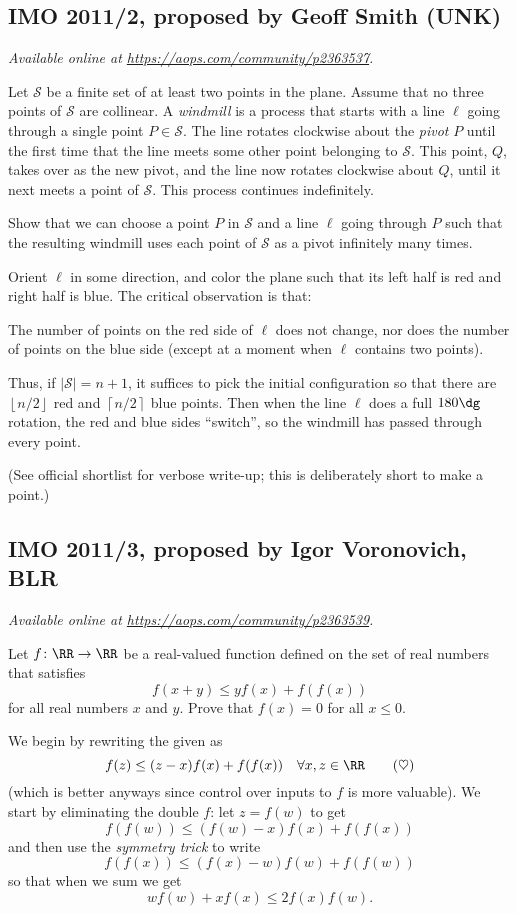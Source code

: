 \documentclass[11pt]{scrartcl}
\begin{document}
\subsection{IMO 2011/2, proposed by Geoff Smith (UNK)}
\textsl{Available online at \url{https://aops.com/community/p2363537}.}
\begin{mdframed}[style=mdpurplebox,frametitle={Problem statement}]
Let $\mathcal{S}$ be a finite set of at least two points in the plane.
Assume that no three points of $\mathcal S$ are collinear.
A \emph{windmill} is a process that starts with a
line $\ell$ going through a single point $P \in \mathcal S$.
The line rotates clockwise about the \emph{pivot} $P$ until the first time
that the line meets some other point belonging to $\mathcal S$.
This point, $Q$, takes over as the new pivot,
and the line now rotates clockwise about $Q$,
until it next meets a point of $\mathcal S$.
This process continues indefinitely.

Show that we can choose a point $P$ in $\mathcal S$ and
a line $\ell$ going through $P$ such that the resulting windmill
uses each point of $\mathcal S$ as a pivot infinitely many times.
\end{mdframed}
Orient $\ell$ in some direction,
and color the plane such that its left half is red
and right half is blue.
The critical observation is that:
\begin{claim*}
  The number of points on the red side of $\ell$ does not change,
  nor does the number of points on the blue side
  (except at a moment when $\ell$ contains two points).
\end{claim*}

Thus, if $|\mathcal S| = n+1$,
it suffices to pick the initial configuration
so that there are $\left\lfloor n/2 \right\rfloor$
red and $\left\lceil n/2 \right\rceil$ blue points.
Then when the line $\ell$ does a full $180\dg$ rotation,
the red and blue sides ``switch'',
so the windmill has passed through every point.

(See official shortlist for verbose write-up;
this is deliberately short to make a point.)
\pagebreak

\subsection{IMO 2011/3, proposed by Igor Voronovich, BLR}
\textsl{Available online at \url{https://aops.com/community/p2363539}.}
\begin{mdframed}[style=mdpurplebox,frametitle={Problem statement}]
Let $f \colon \RR \to \RR$ be a real-valued function
defined on the set of real numbers that satisfies
\[ f(x+y) \leq yf(x) + f(f(x))\]
for all real numbers $x$ and $y$.
Prove that $f(x) = 0$ for all $x \leq 0$.
\end{mdframed}
We begin by rewriting the given as
\[ f(z) \le (z-x)f(x) + f(f(x)) \quad
  \forall x,z \in \RR \qquad (\heartsuit) \]
(which is better anyways since control over inputs to $f$
is more valuable).
We start by eliminating the double $f$:
let $z = f(w)$ to get
\[ f(f(w)) \le (f(w)-x)f(x) + f(f(x)) \]
and then use the \emph{symmetry trick} to write
\[ f(f(x)) \le (f(x)-w)f(w) + f(f(w)) \]
so that when we sum we get
\[ wf(w) + xf(x) \le 2f(x)f(w). \]
\end{document}
